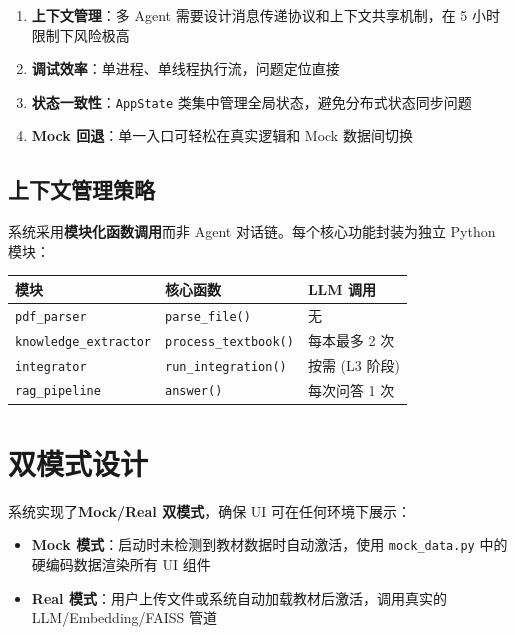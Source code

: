 \documentclass[12pt,a4paper]{article}
\begin{document}
\begin{enumerate}[leftmargin=2em]
    \item \textbf{上下文管理}：多 Agent 需要设计消息传递协议和上下文共享机制，在 5 小时限制下风险极高
    \item \textbf{调试效率}：单进程、单线程执行流，问题定位直接
    \item \textbf{状态一致性}：\texttt{AppState} 类集中管理全局状态，避免分布式状态同步问题
    \item \textbf{Mock 回退}：单一入口可轻松在真实逻辑和 Mock 数据间切换
\end{enumerate}

\subsection{上下文管理策略}

系统采用\textbf{模块化函数调用}而非 Agent 对话链。每个核心功能封装为独立 Python 模块：

\begin{table}[H]
\centering
\begin{tabular}{lll}
\toprule
\textbf{模块} & \textbf{核心函数} & \textbf{LLM 调用} \\
\midrule
\texttt{pdf\_parser} & \texttt{parse\_file()} & 无 \\
\texttt{knowledge\_extractor} & \texttt{process\_textbook()} & 每本最多 2 次 \\
\texttt{integrator} & \texttt{run\_integration()} & 按需 (L3 阶段) \\
\texttt{rag\_pipeline} & \texttt{answer()} & 每次问答 1 次 \\
\bottomrule
\end{tabular}
\end{table}

\section{双模式设计}
\label{sec:dual-mode}

系统实现了\textbf{Mock/Real 双模式}，确保 UI 可在任何环境下展示：

\begin{itemize}[leftmargin=2em]
    \item \textbf{Mock 模式}：启动时未检测到教材数据时自动激活，使用 \texttt{mock\_data.py} 中的硬编码数据渲染所有 UI 组件
    \item \textbf{Real 模式}：用户上传文件或系统自动加载教材后激活，调用真实的 LLM/Embedding/FAISS 管道
\end{itemize}
\end{document}
